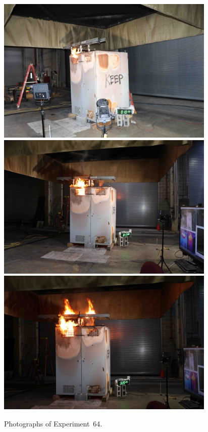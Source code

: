 \documentclass[12pt]{article}
\begin{document}
\begin{figure}[p]
\centering
\includegraphics[height=2.75in]{../FIGURES/Test_64_10_min_39_s} \\
\includegraphics[height=2.75in]{../FIGURES/Test_64_17_min_8_s} \\
\includegraphics[height=2.75in]{../FIGURES/Test_64_20_min_26_s}
\caption[Photographs of Experiment~64]{Photographs of Experiment~64.}
\label{fig:Test_64_photos}
\end{figure}
\end{document}

